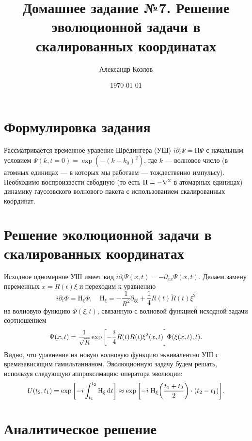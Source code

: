 \documentclass[10pt]{article}
\title{Домашнее задание №7. Решение эволюционной задачи в скалированных координатах}
\author{Александр Козлов}
\date{\today}
\begin{document}
\maketitle

\section*{Формулировка задания}

Рассматривается временное уравение Шрёдингера (УШ) $i\partial_t \Psi = \mathrm{H} \Psi$ с начальным условием $\Psi(k,t=0) = \exp(-(k-k_0)^2)$, где $k$ --- волновое число (в атомных единицах --- в которых мы работаем --- тождественно импульсу). Необходимо воспроизвести свбодную (то есть $\mathrm{H}=-\laplacian$ в атомарных единицах) динамику гауссовского волнового пакета с использованием скалированных координат.

\section{Решение эколюционной задачи в скалированных координатах}

Исходное одномерное УШ имеет вид $i\partial_t \Psi(x,t) = -\partial_{xx} \Psi(x,t)$. Делаем замену переменных $x = R(t) \xi$ и переходим к уравнению
\begin{equation}
 i\partial_t \Phi = \mathrm{H}_\xi\Phi, \quad \mathrm{H}_\xi = -\dfrac{1}{R^2} \partial_{\xi\xi} + \dfrac{1}{4}R(t)\ddot{R}(t)\xi^2
\end{equation}
на волновую функцию $\Phi(\xi,t)$, связанную с волновой функцией исходной задачи соотношением
\begin{equation}
 \Psi(x,t) = \dfrac{1}{\sqrt{R}} \exp\qty[-\dfrac{i}{4} \dot{R}(t) R(t) \xi^2(x,t) ] \Phi(\xi(x,t),t).
\end{equation}
Видно, что уравнение на новую волновую функцию эквивалентно УШ с времязависящим гамильтанианом. Эволюционную задачу будем решать, используя следующую  аппроксимацию оператора эволюции:
\begin{equation}
 U(t_2,t_1) = \exp\qty[-i\int_{t_1}^{t_2} \mathrm{H}_\xi \dd{t}]\approx\exp\qty[-i\; \mathrm{H}_\xi\qty(\frac{t_1+t_2}{2})\cdot (t_2 - t_1)].
\end{equation}

\section{Аналитическое решение}
\end{document}
